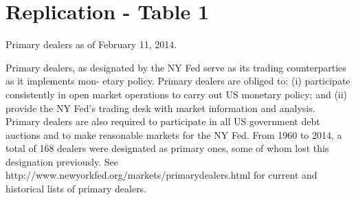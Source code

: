 \documentclass{article}
\begin{document}
\section{Replication - Table 1}
Primary dealers as of February 11, 2014.

Primary dealers, as designated by the NY Fed serve as its trading counterparties as it implements mon-
etary policy. Primary dealers are obliged to: (i) participate consistently in open market operations to carry out US monetary policy; and (ii) provide the NY Fed’s trading desk with market information and analysis. Primary dealers are also required to participate in all US government debt auctions and to make reasonable markets for the NY Fed. From 1960 to 2014, a total of 168 dealers were designated as primary ones, some of whom lost this designation previously. See {\color{blue} http://www.newyorkfed.org/markets/primarydealers.html} for current and historical lists of primary dealers.

\begin{table}[!htbp]
\centering
\begin{adjustbox}{width=\textwidth,center}

\end{adjustbox}
\end{table}
\end{document}
